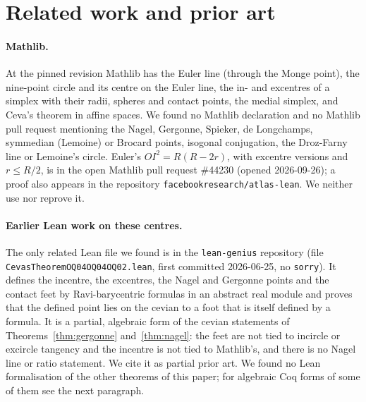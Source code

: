 \documentclass[11pt]{article}
\theoremstyle{definition}
\theoremstyle{remark}
\newcommand{\lean}[1]{\texttt{#1}}
\begin{document}
\section{Related work and prior art}\label{sec:related}
\paragraph{Mathlib.} At the pinned revision Mathlib has the Euler line (through the Monge point), the
nine-point circle and its centre on the Euler line, the in- and excentres of a simplex with their
radii, spheres and contact points, the medial simplex, and Ceva's theorem in affine spaces. We found no
Mathlib declaration and no Mathlib pull request mentioning the Nagel, Gergonne, Spieker, de Longchamps,
symmedian (Lemoine) or Brocard points, isogonal conjugation, the Droz-Farny line or Lemoine's circle.
Euler's $OI^2=R(R-2r)$, with excentre versions and $r\le R/2$, is in the open Mathlib pull request
\#44230 \cite{pr44230} (opened 2026-09-26); a proof also appears in the repository \lean{facebookresearch/atlas-lean}. We neither
use nor reprove it.

\paragraph{Earlier Lean work on these centres.} The only related Lean file we found is in the
\lean{lean-genius} repository \cite{leangenius} (file \lean{CevasTheoremOQ04OQ04OQ02.lean}, first committed
2026-06-25, no \lean{sorry}). It defines the incentre, the excentres, the Nagel and Gergonne points and the contact feet by
Ravi-barycentric formulas
in an abstract real module and proves that the defined point lies on the cevian to a foot that is
itself defined by a formula. It is a partial, algebraic form of the cevian statements of
Theorems~\ref{thm:gergonne} and~\ref{thm:nagel}: the feet are not tied to incircle or excircle
tangency and the incentre is not tied to Mathlib's, and there is no Nagel line or ratio statement. We
cite it as partial prior art. We found no Lean formalisation of the other theorems of this paper;
for algebraic Coq forms of some of them see the next paragraph.
\end{document}
